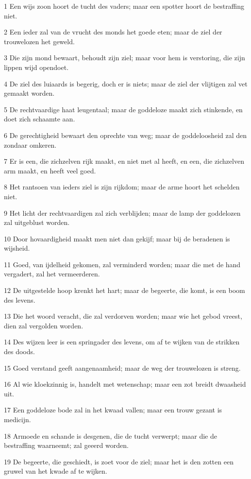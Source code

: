 \par 1 Een wijs zoon hoort de tucht des vaders; maar een spotter hoort de bestraffing niet.
\par 2 Een ieder zal van de vrucht des monds het goede eten; maar de ziel der trouwelozen het geweld.
\par 3 Die zijn mond bewaart, behoudt zijn ziel; maar voor hem is verstoring, die zijn lippen wijd opendoet.
\par 4 De ziel des luiaards is begerig, doch er is niets; maar de ziel der vlijtigen zal vet gemaakt worden.
\par 5 De rechtvaardige haat leugentaal; maar de goddeloze maakt zich stinkende, en doet zich schaamte aan.
\par 6 De gerechtigheid bewaart den oprechte van weg; maar de goddeloosheid zal den zondaar omkeren.
\par 7 Er is een, die zichzelven rijk maakt, en niet met al heeft, en een, die zichzelven arm maakt, en heeft veel goed.
\par 8 Het rantsoen van ieders ziel is zijn rijkdom; maar de arme hoort het schelden niet.
\par 9 Het licht der rechtvaardigen zal zich verblijden; maar de lamp der goddelozen zal uitgeblust worden.
\par 10 Door hovaardigheid maakt men niet dan gekijf; maar bij de beradenen is wijsheid.
\par 11 Goed, van ijdelheid gekomen, zal verminderd worden; maar die met de hand vergadert, zal het vermeerderen.
\par 12 De uitgestelde hoop krenkt het hart; maar de begeerte, die komt, is een boom des levens.
\par 13 Die het woord veracht, die zal verdorven worden; maar wie het gebod vreest, dien zal vergolden worden.
\par 14 Des wijzen leer is een springader des levens, om af te wijken van de strikken des doods.
\par 15 Goed verstand geeft aangenaamheid; maar de weg der trouwelozen is streng.
\par 16 Al wie kloekzinnig is, handelt met wetenschap; maar een zot breidt dwaasheid uit.
\par 17 Een goddeloze bode zal in het kwaad vallen; maar een trouw gezant is medicijn.
\par 18 Armoede en schande is desgenen, die de tucht verwerpt; maar die de bestraffing waarneemt; zal geeerd worden.
\par 19 De begeerte, die geschiedt, is zoet voor de ziel; maar het is den zotten een gruwel van het kwade af te wijken.
